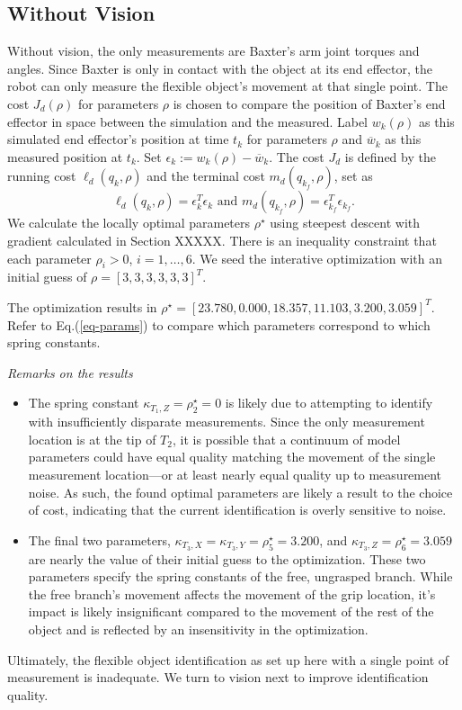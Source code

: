 \documentclass[runningheads,a4paper]{llncs}
\begin{document}
\subsection{Without Vision}
Without vision, the only measurements are Baxter's arm joint torques and angles.  Since Baxter is only in contact with the object at its end effector, the robot can only measure the flexible object's movement at that single point. The cost $J_d(\rho)$ for parameters $\rho$ is chosen to compare the position of Baxter's end effector in space between the simulation and the measured.  Label $w_k(\rho)$ as this simulated end effector's position at time $t_k$ for parameters $\rho$ and $\overline{w}_k$ as this measured position at $t_k$.  Set $\epsilon_k := w_k(\rho)-\overline{w}_k$.  The cost $J_d$ is defined by the running cost $\ell_d(q_k,\rho)$ and the terminal cost $m_d(q_{k_f},\rho)$, set as
\[
\ell_d(q_k,\rho) = \epsilon_k^T\epsilon_k \textrm{ and } m_d(q_{k_f},\rho) = \epsilon_{k_f}^T\epsilon_{k_f}.
\]
We calculate the locally optimal parameters $\rho^\star$ using steepest descent with gradient calculated in Section XXXXX. There is an inequality constraint that each parameter $\rho_i>0$, $i = 1,\ldots,6$. We seed the interative optimization with an initial guess of $\rho = [3, 3, 3, 3, 3, 3]^T$.  %

The optimization results in $\rho^\star = [23.780,  0.000 , 18.357 , 11.103 , 3.200,  3.059]^T$. Refer to Eq.(\ref{eq-params}) to compare which parameters correspond to which spring constants. 

\emph{Remarks on the results}
\begin{itemize}
\item The spring constant $\kappa_{T_1,Z} = \rho^\star_2 = 0$ is likely due to attempting to identify with insufficiently disparate measurements. Since the only measurement location is at the tip of $T_2$, it is possible that a continuum of model parameters could have equal quality matching the movement of the single measurement location---or at least nearly equal quality up to measurement noise. As such, the found optimal parameters are likely a result to the choice of cost, indicating that the current identification is overly sensitive to noise.
\item The final two parameters, $\kappa_{T_3,X} = \kappa_{T_3,Y} = \rho^\star_5 = 3.200$, and $\kappa_{T_3,Z} = \rho^\star_6 = 3.059$ are nearly the value of their initial guess to the optimization. These two parameters specify the spring constants of the free, ungrasped branch. While the free branch's movement affects the movement of the grip location, it's impact is likely insignificant compared to the movement of the rest of the object and is reflected by an insensitivity in the optimization.
\end{itemize}
Ultimately, the flexible object identification as set up here with a single point of measurement is inadequate. We turn to vision next to improve identification quality.
\end{document}
